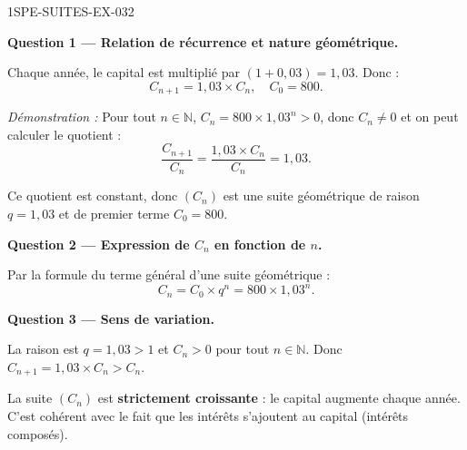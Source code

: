\begin{corrige}{1SPE-SUITES-EX-032}

\textbf{Question 1 — Relation de récurrence et nature géométrique.}

Chaque année, le capital est multiplié par $(1 + 0{,}03) = 1{,}03$. Donc :
\[
  C_{n+1} = 1{,}03 \times C_n, \quad C_0 = 800.
\]

\textit{Démonstration :} Pour tout $n \in \mathbb{N}$, $C_n = 800 \times 1{,}03^n > 0$, donc $C_n \neq 0$ et on peut calculer le quotient :
\[
  \frac{C_{n+1}}{C_n} = \frac{1{,}03 \times C_n}{C_n} = 1{,}03.
\]


Ce quotient est constant, donc $(C_n)$ est une suite géométrique de raison $q = 1{,}03$ et de premier terme $C_0 = 800$.

\medskip
\textbf{Question 2 — Expression de $C_n$ en fonction de $n$.}

Par la formule du terme général d'une suite géométrique :
\[
  C_n = C_0 \times q^n = 800 \times 1{,}03^n.
\]

\medskip
\textbf{Question 3 — Sens de variation.}

La raison est $q = 1{,}03 > 1$ et $C_n > 0$ pour tout $n \in \mathbb{N}$. Donc $C_{n+1} = 1{,}03 \times C_n > C_n$.


La suite $(C_n)$ est \textbf{strictement croissante} : le capital augmente chaque année. C'est cohérent avec le fait que les intérêts s'ajoutent au capital (intérêts composés).


\end{corrige}
